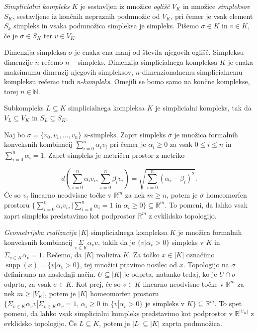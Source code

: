 \documentclass[mat1]{fmfdelo}
\DeclareRobustCommand{\si}{
    \bar{\sigma}}
\DeclareMathOperator*{\supp}{supp}
\newcommand{\R}{\mathbb R}
\newcommand{\N}{\mathbb N}
\begin{document}
\begin{definicija}
    \textit{Simplicialni kompleks $K$} je sestavljen iz množice \textit{oglišč} $V_K$ in množice \textit{simpleksov} $S_K$, sestavljene iz končnih nepraznih podmnožic od $V_K$, pri čemer je vsak element $S_k$ simpleks in vsaka podmnožica simpleksa je simpleks. Pišemo $\sigma \in K$ in $v \in K$, če je $\sigma \in S_K$ ter $v \in V_K$. 
\end{definicija}

Dimenzija simpleksa $\sigma$ je enaka ena manj od števila njegovih oglišč. Simpleksu dimenzije $n$ rečemo $n-$simpleks. Dimenzija simplicialnega kompleksa $K$ je enaka maksimumu dimenzij njegovih simpleksov, $n$-dimenzionalnemu simplicialnemu kompleksu rečemo tudi \textit{n-kompleks}. Omejili se bomo samo na končne komplekse, torej $n \in \N$.


Subkompleks $L\subseteq K$ simplicialnega kompleksa $K$ je simplicialni kompleks, tak da $V_L\subseteq V_K$ in $S_L\subseteq S_K$.


 Naj bo $\sigma = \{v_0,v_1,\ldots,v_n\}$ $n$-simpleks. Zaprt
 simpleks $\bar{\sigma}$ je množica formalnih konveksnih kombinacij $\sum\limits_{i=0}^{n}\alpha_i v_i$
 pri čemer je $\alpha_i \ge 0$ za vsak $0\le i \le n$ in $\sum\limits_{i=0}^{n}\alpha_i = 1$. Zaprt simpleks je metričen prostor z metriko
 
 \begin{equation}
     d(\sum\limits_{i=0}^{n}\alpha_i v_i,\sum\limits_{i=0}^{n}\beta_i v_i) = \sqrt{\sum\limits_{i=0}^{n}(\alpha_i - \beta_i)^2}.
     \label{eq:metrika}    
 \end{equation}
 Če so $v_i$ linearno neodvisne točke v $\R^m$ za nek $m\geq n$, potem je $\bar{\sigma}$ homeomorfen prostoru 
 $\{\sum\limits_{i=0}^{n}\alpha_i v_i, | \sum\limits_{i=0}^{n}\alpha_i = 1 \text{ in } \alpha_i \ge 0 \}\subseteq \R^m$. To pomeni, da lahko vsak zaprt simpleks predstavimo kot podprostor $\R^m$ z evklidsko topologijo.

 \textit{Geometrijska realizacija} $|K|$ simplicialnega kompleksa $K$ je 
 množica formalnih konveksnih kombinacij $\underset{v \in K}{\Sigma}\alpha_v v$, takih da je $\{v | \alpha_v > 0\}$ simpleks v $K$ in 
 $\Sigma_{v\in K}\alpha_v=1$. Rečemo, da $|K|$ realizira $K$. Za točko $x\in |K|$ označimo $\supp(x)=\{v | \alpha_v > 0\}$, 
 tej množici pravimo nosilec od $x$. Topologijo na $\si$ definiramo na naslednji način. $U \subseteq |K|$ je odprta, natanko tedaj, ko je $U \cap 
 \si$ odprta, za vsak $\sigma \in K$. Kot prej, če so $v\in K$ linearno neodvisne točke v $\R^m$ za nek $m\geq |V_K|$, potem je 
 $|K|$ homeomorfen prostoru $\{\Sigma_{v\in K}\alpha_v v | \Sigma_{v\in K} \alpha_v = 1 \text{, } \alpha_i
 \ge 0 \text{ in } \{v | \alpha_v > 0\} \text{ je simpleks v $K$}\} \subseteq \R^m$. To spet pomeni, da lahko vsak simplicialni
 kompleks predstavimo kot podprostor v $\R^{|V_K|}$ z evklidsko topologijo.
 Če $L\subseteq K$, potem je $|L|\subseteq |K|$ zaprta podmnožica.
 
\end{document}
